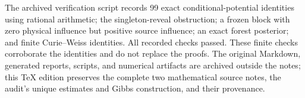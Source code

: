 The archived verification script records 99 exact conditional-potential
identities using rational arithmetic; the singleton-reveal obstruction;
a frozen block with zero physical influence but positive source influence;
an exact forest posterior; and finite Curie--Weiss identities. All recorded
checks passed. These finite checks corroborate the identities and do not
replace the proofs. The original Markdown, generated reports, scripts,
and numerical artifacts are archived outside the notes; this TeX edition
preserves the complete two mathematical source notes, the audit's unique
estimates and Gibbs construction, and their provenance.
